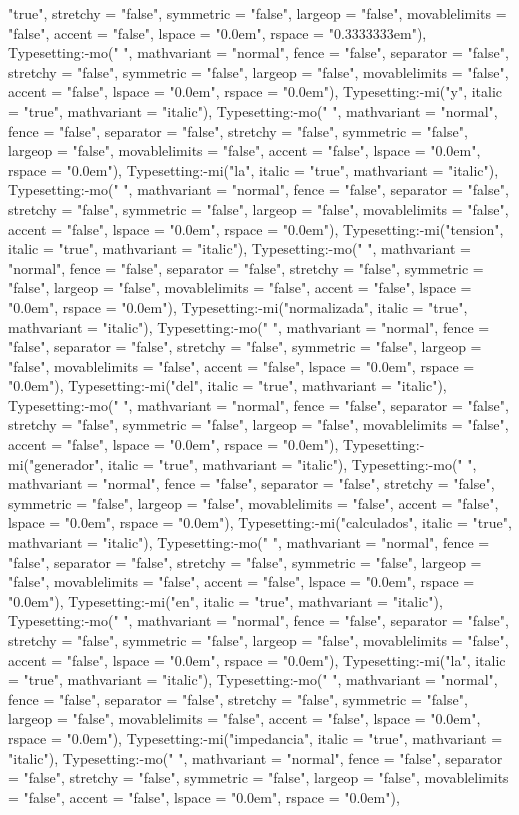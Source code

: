 \documentclass{article}
\begin{document}
\begin{Maple Normal}
{\begin{Maple Normal}
{"true", stretchy = "false", symmetric = "false", largeop = "false", movablelimits = "false", accent = "false", lspace = "0.0em", rspace = "0.3333333em"), Typesetting:-mo(" ", mathvariant = "normal", fence = "false", separator = "false", stretchy = "false", symmetric = "false", largeop = "false", movablelimits = "false", accent = "false", lspace = "0.0em", rspace = "0.0em"), Typesetting:-mi("y", italic = "true", mathvariant = "italic"), Typesetting:-mo(" ", mathvariant = "normal", fence = "false", separator = "false", stretchy = "false", symmetric = "false", largeop = "false", movablelimits = "false", accent = "false", lspace = "0.0em", rspace = "0.0em"), Typesetting:-mi("la", italic = "true", mathvariant = "italic"), Typesetting:-mo(" ", mathvariant = "normal", fence = "false", separator = "false", stretchy = "false", symmetric = "false", largeop = "false", movablelimits = "false", accent = "false", lspace = "0.0em", rspace = "0.0em"), Typesetting:-mi("tension", italic = "true", mathvariant = "italic"), Typesetting:-mo(" ", mathvariant = "normal", fence = "false", separator = "false", stretchy = "false", symmetric = "false", largeop = "false", movablelimits = "false", accent = "false", lspace = "0.0em", rspace = "0.0em"), Typesetting:-mi("normalizada", italic = "true", mathvariant = "italic"), Typesetting:-mo(" ", mathvariant = "normal", fence = "false", separator = "false", stretchy = "false", symmetric = "false", largeop = "false", movablelimits = "false", accent = "false", lspace = "0.0em", rspace = "0.0em"), Typesetting:-mi("del", italic = "true", mathvariant = "italic"), Typesetting:-mo(" ", mathvariant = "normal", fence = "false", separator = "false", stretchy = "false", symmetric = "false", largeop = "false", movablelimits = "false", accent = "false", lspace = "0.0em", rspace = "0.0em"), Typesetting:-mi("generador", italic = "true", mathvariant = "italic"), Typesetting:-mo(" ", mathvariant = "normal", fence = "false", separator = "false", stretchy = "false", symmetric = "false", largeop = "false", movablelimits = "false", accent = "false", lspace = "0.0em", rspace = "0.0em"), Typesetting:-mi("calculados", italic = "true", mathvariant = "italic"), Typesetting:-mo(" ", mathvariant = "normal", fence = "false", separator = "false", stretchy = "false", symmetric = "false", largeop = "false", movablelimits = "false", accent = "false", lspace = "0.0em", rspace = "0.0em"), Typesetting:-mi("en", italic = "true", mathvariant = "italic"), Typesetting:-mo(" ", mathvariant = "normal", fence = "false", separator = "false", stretchy = "false", symmetric = "false", largeop = "false", movablelimits = "false", accent = "false", lspace = "0.0em", rspace = "0.0em"), Typesetting:-mi("la", italic = "true", mathvariant = "italic"), Typesetting:-mo(" ", mathvariant = "normal", fence = "false", separator = "false", stretchy = "false", symmetric = "false", largeop = "false", movablelimits = "false", accent = "false", lspace = "0.0em", rspace = "0.0em"), Typesetting:-mi("impedancia", italic = "true", mathvariant = "italic"), Typesetting:-mo(" ", mathvariant = "normal", fence = "false", separator = "false", stretchy = "false", symmetric = "false", largeop = "false", movablelimits = "false", accent = "false", lspace = "0.0em", rspace = "0.0em"), }
\end{Maple Normal}}
\end{Maple Normal}
\end{document}

